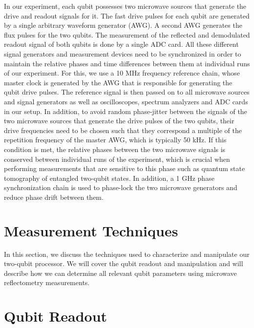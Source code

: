 In our experiment, each qubit possesses two microwave sources that generate the drive and readout signals for it. The fast drive pulses for each qubit are generated by a single arbitrary waveform generator (AWG). A second AWG generates the flux pulses for the two qubits. The measurement of the reflected and demodulated readout signal of both qubits is done by a single ADC card. All these different signal generators and measurement devices need to be synchronized in order to maintain the relative phases and time differences between them at individual runs of our experiment. For this, we use a 10 MHz frequency reference chain, whose master clock is generated by the AWG that is responsible for generating the qubit drive pulses. The reference signal is then passed on to all microwave sources and signal generators as well as oscilloscopes, spectrum analyzers and ADC cards in our setup. In addition, to avoid random phase-jitter between the signals of the two microwave sources that generate the drive pulses of the two qubits, their drive frequencies need to be chosen such that they correspond a multiple of the repetition frequency of the master AWG, which is typically 50 kHz. If this condition is met, the relative phases between the two microwave signals is conserved between individual runs of the experiment, which is crucial when performing measurements that are sensitive to this phase such as quantum state tomography of entangled two-qubit states. In addition, a 1 GHz phase synchronization chain is used to phase-lock the two microwave generators and reduce phase drift between them.

\section{Measurement Techniques}

In this section, we discuss the techniques used to characterize and manipulate our two-qubit processor. We will cover the qubit readout and manipulation and will describe how we can determine all relevant qubit parameters using microwave reflectometry measurements.

\section{Qubit Readout} \label{section:qubit_readout}

